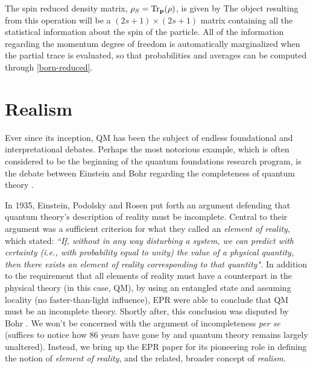 \documentclass[12pt,a4paper,notitlepage]{report}
\begin{document}
%
The spin reduced density matrix, $\rho_S = \Tr_{\vb{p}}(\rho)$, is given by
%
The object resulting from this operation will be a $(2s+1)\times(2s+1)$ matrix containing all the statistical information about the spin of the particle. All of the information regarding the momentum degree of freedom is automatically marginalized when the partial trace is evaluated, so that probabilities and averages can be computed through \eqref{born-reduced}.

\section{Realism}

Ever since its inception, QM has been the subject of endless foundational and interpretational debates. Perhaps the most notorious example, which is often considered to be the beginning of the quantum foundations research program, is the debate between Einstein and Bohr regarding the completeness of quantum theory \cite{epr_1935, bohr_1935}.

In 1935, Einstein, Podolsky and Rosen put forth an argument defending that quantum theory's description of reality must be incomplete.
Central to their argument was a sufficient criterion for what they called an {\it element of reality}, which stated:
%
{\it ``If, without in any way disturbing a system, we can predict with certainty (i.e., with probability equal to unity) the value of a physical quantity, then there exists an element of reality corresponding to that quantity".}
%
In addition to the requirement that all elements of reality must have a counterpart in the physical theory (in this case, QM), by using an entangled state and assuming locality (no faster-than-light influence), EPR were able to conclude that QM must be an incomplete theory. Shortly after, this conclusion was disputed by Bohr \cite{bohr_1935}. We won't be concerned with the argument of incompleteness {\it per se} (suffices to notice how 86 years have gone by and quantum theory remains largely unaltered). Instead, we bring up the EPR paper for its pioneering role in defining the notion of {\it element of reality}, and the related, broader concept of {\it realism}.
\end{document}
